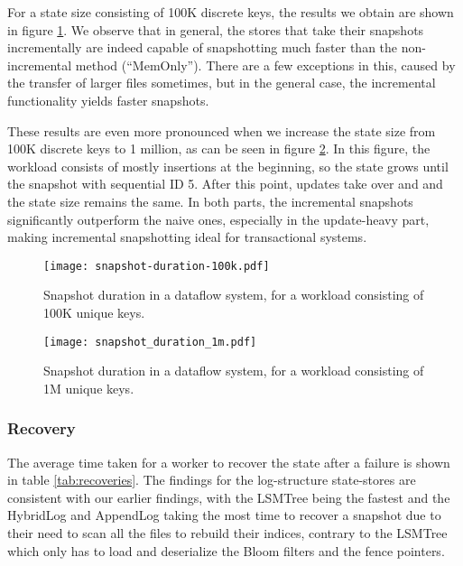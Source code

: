 For a state size consisting of 100K discrete keys, the results we obtain are shown in figure \ref{fig:snapshot-dataflow-100k}. We observe that in general, the stores that take their snapshots incrementally are indeed capable of snapshotting much faster than the non-incremental method (``MemOnly''). There are a few exceptions in this, caused by the transfer of larger files sometimes, but in the general case, the incremental functionality yields faster snapshots.

These results are even more pronounced when we increase the state size from 100K discrete keys to 1 million, as can be seen in figure \ref{fig:snapshot-dataflow-1m}. In this figure, the workload consists of mostly insertions at the beginning, so the state grows until the snapshot with sequential ID 5. After this point, updates take over and and the state size remains the same. In both parts, the incremental snapshots significantly outperform the naive ones, especially in the update-heavy part, making incremental snapshotting ideal for transactional systems.

\begin{figure}[h]
    \centering
    \texttt{[image: snapshot-duration-100k.pdf]}
    \caption{Snapshot duration in a dataflow system, for a workload consisting of 100K unique keys.}
    \label{fig:snapshot-dataflow-100k}
\end{figure}

\begin{figure}[h]
    \centering
    \texttt{[image: snapshot\_duration\_1m.pdf]}
    \caption{Snapshot duration in a dataflow system, for a workload consisting of 1M unique keys.}
    \label{fig:snapshot-dataflow-1m}
\end{figure}

\subsubsection{Recovery}

The average time taken for a worker to recover the state after a failure is shown in table \ref{tab:recoveries}. The findings for the log-structure state-stores are consistent with our earlier findings, with the LSMTree being the fastest and the HybridLog and AppendLog taking the most time to recover a snapshot due to their need to scan all the files to rebuild their indices, contrary to the LSMTree which only has to load and deserialize the Bloom filters and the fence pointers.

